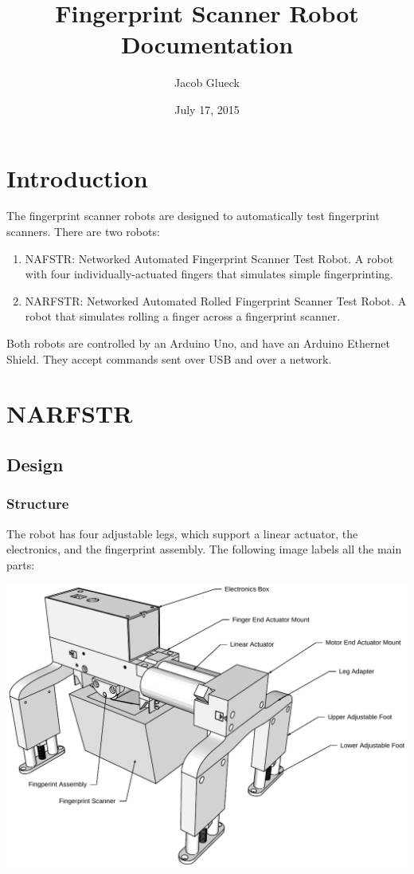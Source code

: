 \documentclass[letterpaper,10pt,english]{sphinxmanual}
\title{Fingerprint Scanner Robot Documentation}
\date{July 17, 2015}
\author{Jacob Glueck}
\begin{document}
\maketitle
\tableofcontents
{}\label{index::doc}



\chapter{Introduction}
\label{intro:introduction}\label{intro:welcome-to-fingerprint-scanner-robot-s-documentation}\label{intro::doc}
The fingerprint scanner robots are designed to automatically test fingerprint scanners. There are two robots:
\begin{enumerate}
\item {} 
NAFSTR: Networked Automated Fingerprint Scanner Test Robot. A robot with four individually-actuated fingers that simulates simple fingerprinting.

\item {} 
NARFSTR: Networked Automated Rolled Fingerprint Scanner Test Robot. A robot that simulates rolling a finger across a fingerprint scanner.

\end{enumerate}

Both robots are controlled by an Arduino Uno, and have an Arduino Ethernet Shield. They accept commands sent over USB and over a network.


\chapter{NARFSTR}
\label{NARFSTR::doc}\label{NARFSTR:narfstr}

\section{Design}
\label{NARFSTR:design}

\subsection{Structure}
\label{NARFSTR:structure}
The robot has four adjustable legs, which support a linear actuator, the electronics, and the fingerprint assembly. The following image labels all the main parts:

\includegraphics{OverviewDiagram.pdf}
\end{document}
